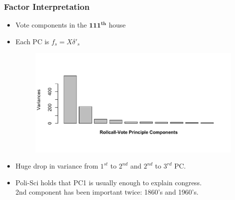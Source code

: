 \documentclass[
  shownotes,
  xcolor={svgnames},
  hyperref={colorlinks,citecolor=DarkBlue,linkcolor=DarkRed,urlcolor=DarkBlue}
  , aspectratio=169]{beamer}
\newcommand{\sg}{\color{DarkSlateGray}}
\newcommand{\bs}[1]{\boldsymbol{#1}}
\begin{document}
\begin{frame}[fragile]
\frametitle{Factor Interpretation}

\begin{itemize}

  \item Vote components in the $\bs{111^{th}}$ house
 
 \item Each PC is $f_s = X\delta'_s$ 

  \begin{figure}[H] \centering
            \captionsetup{justification=centering}
              \includegraphics[scale=0.5]{figures/VOTEscree}
              
 \end{figure}

\item Huge drop in variance from $1^{st}$ to $2^{nd}$ and  $2^{nd}$ to $3^{rd}$ PC.
\item Poli-Sci holds that PC1 is usually enough to explain congress. \\\sg 2nd component has been important twice: 1860's and 1960's.

\end{itemize}


\end{frame}
\end{document}
